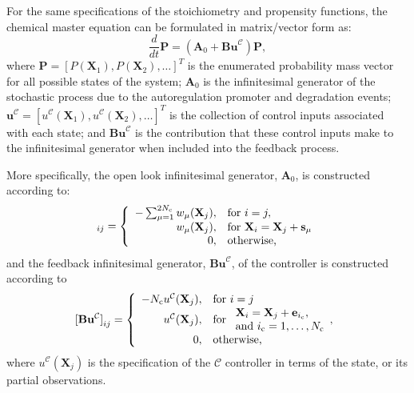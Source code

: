 \documentclass[12pt]{article}
\begin{document}
For the same specifications of the stoichiometry and propensity functions, the chemical master equation can be formulated in matrix/vector form as:
\begin{equation}
\frac{d}{dt}\mathbf{P}=(\mathbf{A}_0+\textbf{Bu}^{\mathcal{C}})\mathbf{P},\label{CME}
\end{equation}
where $\mathbf{P} = [P(\mathbf{X}_1), P(\mathbf{X}_2), \ldots ]^T$ is the enumerated probability mass vector for all possible states of the system; $\mathbf{A}_0$ is the infinitesimal generator of the stochastic process due to the autoregulation promoter and degradation events;  $\textbf{u}^{\mathcal{C}} =[u^{\mathcal{C}}(\mathbf{X}_1), u^{\mathcal{C}}(\mathbf{X}_2), \ldots ]^T$ is the collection of control inputs associated with each state; and $\textbf{Bu}^{\mathcal{C}}$ is the contribution that these control inputs make to the infinitesimal generator when included into the feedback process. 
 
More specifically, the open look infinitesimal generator, $\mathbf{A}_0$, is constructed according to:
\begin{equation}
[\mathbf{A}_0]_{ij} = \left\{
\begin{array}{rl}
-\sum_{\mu =1}^{2N_{\rm c}} w_{\mu}(\mathbf{X}_j), &\text{for }i=j,\\
w_{\mu}(\mathbf{X}_j), &\text{for }\mathbf{X}_i = \mathbf{X}_j+\mathbf{s}_\mu\\
0, & \text{otherwise,}
\end{array}\right. 
\label{InfA}
\end{equation}
and the feedback infinitesimal generator, $\mathbf{Bu}^{\mathcal{C}}$, of the controller is constructed according to
\begin{equation}
[\mathbf{Bu^{\mathcal{C}}]}_{ij} = \left\{
\begin{array}{rl}
- N_{\rm c}{u}^{\mathcal{C}}(\mathbf{X}_j), &\text{for }i=j\\
{u}^{\mathcal{C}}(\mathbf{X}_j), &\text{for }\begin{array}{ll}\mathbf{X}_i =\mathbf{X}_j + \mathbf{e}_{i_{\rm c}}, \\ \text{and } i_{\rm c} = 1,\ldots,N_{\rm c}\end{array},\\
0, & \text{otherwise,}
\end{array}\right.
\label{InfB}
\end{equation}
where ${u}^{\mathcal{C}}(\mathbf{X}_j)$ is the specification of the $\mathcal{C}$ controller in terms of the state, or its partial observations.
\end{document}
